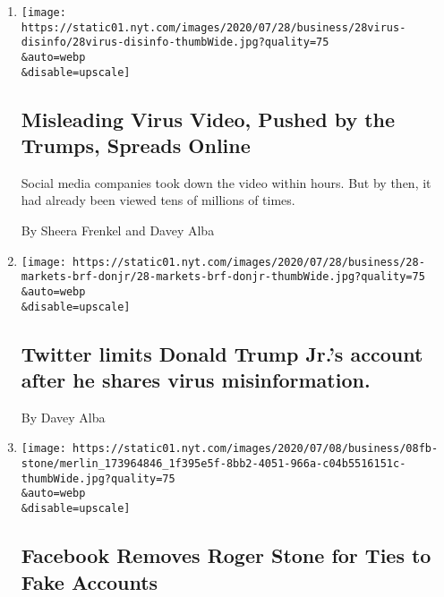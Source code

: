 \begin{enumerate}
\def\labelenumi{\arabic{enumi}.}
\item
  \href{/2020/07/28/technology/virus-video-trump.html}{}

  \texttt{[image: https://static01.nyt.com/images/2020/07/28/business/28virus-disinfo/28virus-disinfo-thumbWide.jpg?quality=75\\\&auto=webp\\\&disable=upscale]}

  \hypertarget{misleading-virus-video-pushed-by-the-trumps-spreads-online}{%
  \subsection{Misleading Virus Video, Pushed by the Trumps, Spreads
  Online}\label{misleading-virus-video-pushed-by-the-trumps-spreads-online}}

  Social media companies took down the video within hours. But by then,
  it had already been viewed tens of millions of times.

  By Sheera Frenkel and Davey Alba
\item
  \href{/2020/07/28/business/twitter-limits-donald-trump-jrs-account-after-he-shares-virus-misinformation.html}{}

  \texttt{[image: https://static01.nyt.com/images/2020/07/28/business/28-markets-brf-donjr/28-markets-brf-donjr-thumbWide.jpg?quality=75\\\&auto=webp\\\&disable=upscale]}

  \hypertarget{twitter-limits-donald-trump-jrs-account-after-he-shares-virus-misinformation}{%
  \subsection{Twitter limits Donald Trump Jr.'s account after he shares
  virus
  misinformation.}\label{twitter-limits-donald-trump-jrs-account-after-he-shares-virus-misinformation}}

  By Davey Alba
\item
  \href{/2020/07/08/technology/roger-stone-facebook.html}{}

  \texttt{[image: https://static01.nyt.com/images/2020/07/08/business/08fb-stone/merlin\_173964846\_1f395e5f-8bb2-4051-966a-c04b5516151c-thumbWide.jpg?quality=75\\\&auto=webp\\\&disable=upscale]}

  \hypertarget{facebook-removes-roger-stone-for-ties-to-fake-accounts}{%
  \subsection{Facebook Removes Roger Stone for Ties to Fake
  Accounts}\label{facebook-removes-roger-stone-for-ties-to-fake-accounts}}


\end{enumerate}
